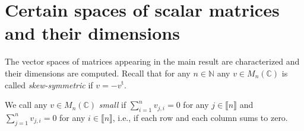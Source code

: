 \documentclass[10pt,a4paper]{amsart}
\numberwithin{equation}{section}
\newcommand{\pint}{\mathbb{N}}
\newcommand{\comps}{\mathbb{C}}
\newcommand{\dwi}[1]{\llbracket{#1}\rrbracket}
\newcommand{\Stra}{^{\mathrm{t}}}
\newcommand{\squarematrices}[2]{M_{#1}(#2)}
\newcommand{\thedim}{n}
\begin{document}
\section{Certain spaces of scalar matrices and their dimensions}
\label{section:dimensions}

  {
  \newcommand{\themat}{v}
  The vector spaces of matrices appearing in the main result are characterized and their dimensions are computed.
  Recall that for any $\thedim\in\pint$ any $\themat\in\squarematrices{\thedim}{\comps}$ is called \emph{skew-symmetric} if $\themat=-\themat\Stra$.
  }

  \begin{Definition}
    \label{definition:small-matrix}
  \newcommand{\themat}{v}
  \newcommand{\thematx}[2]{v_{#1,#2}}
  \newcommand{\indi}{i}
  \newcommand{\indj}{j}
  We call any $\themat\in\squarematrices{\thedim}{\comps}$ \emph{small} if $\sum_{\indi=1}^\thedim\thematx{\indj}{\indi}=0$ for any $\indj\in\dwi{\thedim}$ and $\sum_{\indj=1}^\thedim\thematx{\indj}{\indi}=0$ for any $\indi\in\dwi{\thedim}$, i.e., if each row and each column sums to zero.
\end{Definition}
\end{document}
